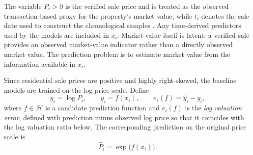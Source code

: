 \documentclass[10pt]{article}
\theoremstyle{definition}
\newcommand{\1}{\mathbf{1}}
\begin{document}

{The variable $P_i>0$ is the verified sale price and is treated as the observed transaction-based proxy for the property's market value, while $t_i$ denotes the sale date used to construct the chronological samples \cite{CCAOModelResAVM2026,IAAO2026ExposureRatio}. Any time-derived predictors used by the models are included in $x_i$. Market value itself is latent: a verified sale provides an observed market-value indicator rather than a directly observed market value. The prediction problem is to estimate market value from the information available in $x_i$.}

Since residential sale prices are positive and highly right-skewed, the baseline models are trained on the log-price scale. Define
\begin{equation}
\label{eq:prediction_scale}
y_i=\log P_i,
\qquad
\widehat{y}_i=f(x_i),
\qquad
e_i(f)=\widehat{y}_i-y_i,
\end{equation}
{where $f\in\mathcal{H}$ is a candidate prediction function and $e_i(f)$ is the \emph{log valuation error}, defined with prediction minus observed log price so that it coincides with the log valuation ratio below.}
The corresponding prediction on the original price scale is
\begin{equation}
\label{eq:price_prediction}
\widehat{P}_i=\exp\bigl(f(x_i)\bigr).
\end{equation}


\end{document}
